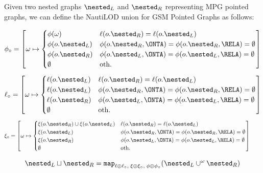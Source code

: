 \begin{definition}
	Given two nested graphs $\nested_L$ and $\nested_R$ representing MPG pointed graphs, we can define the NautiLOD  union for GSM  Pointed Graphs as follows:
	
	\[\phi_{\circ} = \left[\omega\mapsto \begin{cases}
	\phi(\omega) & \ell(o.\nested_R)=\ell(o.\nested_L)\\
	\phi(o.\nested_L) & \phi(o.\nested_R,\ONTA)=\phi(o.\nested_R,\RELA)=\emptyset\\
	\phi(o.\nested_R) & \phi(o.\nested_L,\ONTA)=\phi(o.\nested_L,\RELA)=\emptyset\\
	\emptyset & \textup{oth.}\\
	\end{cases}\right]\]
	\[\ell_\circ = \left[\omega\mapsto\begin{cases}
	\ell(o.\nested_L) & \ell(o.\nested_R)=\ell(o.\nested_L) \\
	\ell(o.\nested_L) & \phi(o.\nested_R,\ONTA)=\phi(o.\nested_R,\RELA)=\emptyset\\
	\ell(o.\nested_R) & \phi(o.\nested_L,\ONTA)=\phi(o.\nested_L,\RELA)=\emptyset\\
	\emptyset & \textup{oth.} \\
	\end{cases}\right]\]
	\[ \xi_\circ = \left[\omega\mapsto\begin{cases}
	\xi(o.\nested_R)\cup \xi(o.\nested_L) & \ell(o.\nested_R)=\ell(o.\nested_L) \\
	\xi(o.\nested_L) & \phi(o.\nested_R,\ONTA)=\phi(o.\nested_R,\RELA)=\emptyset\\
	\xi(o.\nested_R) & \phi(o.\nested_L,\ONTA)=\phi(o.\nested_L,\RELA)=\emptyset\\
	\emptyset & \textup{oth.} \\
	\end{cases}\right]\qquad\]
	
	
	\[\nested_L \sqcup \nested_R = \texttt{map}_{\ell\oplus \ell_\circ,\;\xi\oplus \xi_\circ,\;\phi\oplus \phi_\circ}(\nested_L \cup^\omega \nested_R)\] 
\end{definition}

